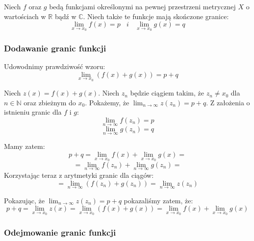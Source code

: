 \documentclass{article}
\begin{document}
Niech \(f\) oraz \(g\) bedą funkcjami określonymi na pewnej przestrzeni metrycznej \(X\) o wartościach
w \(\mathbb{R}\) bądź w \(\mathbb{C}\). Niech także te funkcje mają skończone granice:
\begin{equation*}
    \lim_{x \to x_0} f(x) = p \ \ \ \ i \ \ \ \ \lim_{x \to x_0} g(x) = q
\end{equation*}

\subsubsection{Dodawanie granic funkcji}

Udowodnimy prawdziwość wzoru:
\begin{equation*}
    \lim_{x \to x_0}(f(x) + g(x)) = p + q
\end{equation*}

Niech \(z(x) = f(x) + g(x)\). Niech \(z_n\) będzie ciągiem takim, że \(z_n \neq x_0\) dla \(n \in \mathbb{N}\) oraz zbieżnym do \(x_0\).
Pokażemy, że \(\lim_{n \to \infty} z(z_n) = p + q\). Z założenia o istnieniu granic dla \(f\) i \(g\):
\begin{equation*}
    \lim_{n \to \infty} f(z_n) = p
\end{equation*}
\begin{equation*}
    \lim_{n \to \infty} g(z_n) = q
\end{equation*}

Mamy zatem:
\begin{equation*}
    p + q = \lim_{x \to x_0} f(x) + \lim_{x \to x_0} g(x) = 
\end{equation*}
\begin{equation*}
    = \lim_{n \to \infty} f(z_n) + \lim_{n \to \infty} g(z_n) =
\end{equation*}
Korzystając teraz z arytmetyki granic dla ciągów:
\begin{equation*}
    = \lim_{n \to \infty} (f(z_n) + g(z_n)) = \lim_{n \to \infty} z(z_n)
\end{equation*}

Pokazując, że \(\lim_{n \to \infty} z(z_n) = p + q\) pokazaliśmy zatem, że:
\begin{equation*}
    p + q = \lim_{x \to x_0} z(x) = \lim_{x \to x_0} (f(x) + g(x)) = \lim_{x \to x_0} f(x) + \lim_{x \to x_0} g(x)
\end{equation*}

\subsubsection{Odejmowanie granic funkcji}
\end{document}
